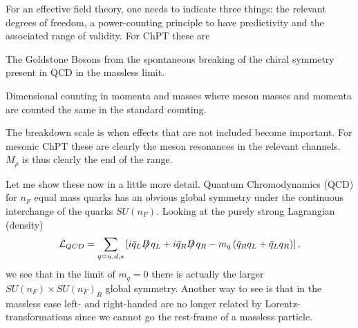 \documentclass[cits,hyper]{PoS}
\begin{document}
For an effective field theory, one needs to indicate three things:
the relevant degrees of freedom, a power-counting principle to have predictivity
and the associated range of validity.
For ChPT these are
\begin{description}
\setlength{\itemsep}{0cm}
\setlength{\parsep}{0cm}
\item[Degrees of freedom:] The Goldstone Bosons from the spontaneous
breaking of the chiral symmetry present in QCD in the massless limit.
\item[Power-counting:] Dimensional counting in momenta and masses where
meson masses and momenta are counted the same in the standard counting.
\item[Range of validity:] The breakdown scale is when effects that
are not included become important. For mesonic ChPT these
are clearly the meson resonances in the relevant channels.
$M_\rho$ is thus clearly the end of the range.
\end{description}
Let me show these now in a little more detail. Quantum Chromodynamics (QCD)
for $n_F$ equal mass quarks has an obvious global symmetry under the continuous
interchange of the quarks $SU(n_F)$. Looking at
the purely strong Lagrangian (density)
\begin{equation}
{\cal L}_{QCD} =  \sum_{q=u,d,s}
\left[i \bar q_L D\hskip-1.3ex/\, q_L +i \bar q_R D\hskip-1.3ex/\, q_R
- m_q\left(\bar q_R q_L + \bar q_L q_R \right)
\right],
\end{equation}
we see that in the limit of $m_q=0$ there is actually the larger
$SU(n_F)\times SU(n_F)_R$ global symmetry. Another way to see is that in the
massless case left- and right-handed are no longer related by 
Lorentz-transformations since we cannot go the rest-frame of a massless particle.
\end{document}
